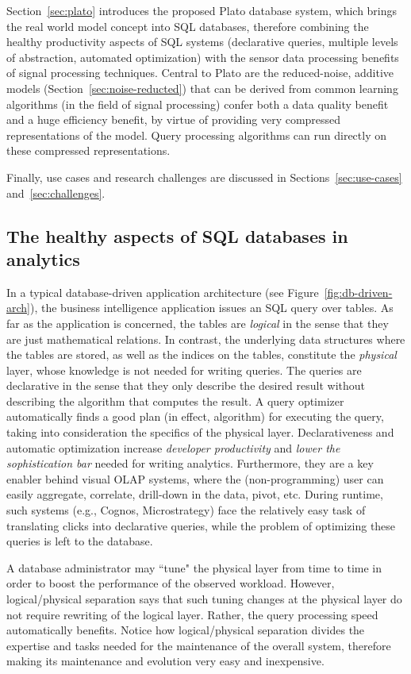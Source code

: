 Section~\ref{sec:plato} introduces the proposed Plato database system, which brings the real world model concept into SQL databases, therefore combining the healthy productivity aspects of SQL systems (declarative queries, multiple levels of abstraction, automated optimization) with the sensor data processing benefits of signal processing techniques. Central to Plato  are the reduced-noise, additive models (Section~\ref{sec:noise-reducted}) that can be derived from common learning algorithms (in the field of signal processing) confer both a data quality benefit and a huge efficiency benefit, by virtue of providing very compressed representations of the model. Query processing algorithms can run directly on these compressed representations.

Finally, use cases and research challenges are discussed in Sections~\ref{sec:use-cases} and~\ref{sec:challenges}.
 
\subsection{The healthy aspects of SQL databases in analytics}
\label{sec:healthy-aspects}

In a typical database-driven application architecture (see Figure~\ref{fig:db-driven-arch}), the business intelligence application issues an SQL query over tables. As far as the application is concerned, the tables are {\em logical} in the sense that they are just mathematical relations. In contrast, the underlying data structures where the tables are stored, as well as the indices on the tables, constitute the {\em physical} layer, whose knowledge is not needed for writing queries. The queries are declarative in the sense that they only describe the desired result without describing the algorithm that computes the result. A query optimizer automatically finds a good plan (in effect, algorithm) for executing the query, taking into consideration the specifics of the physical layer. Declarativeness and automatic optimization increase {\em developer productivity} and {\em lower the sophistication bar} needed for writing analytics. Furthermore, they are a key enabler behind visual OLAP systems, where the (non-programming) user can easily aggregate, correlate, drill-down in the data, pivot, etc. During runtime, such systems (e.g., Cognos, Microstrategy) face the relatively easy task of translating clicks into declarative queries, while the problem of optimizing these queries is left to the database.

A database administrator may ``tune" the physical layer from time to time in order to boost the performance of the observed workload. However, logical/physical separation says that such tuning changes at the physical layer do not require rewriting of the logical layer. Rather, the query processing speed automatically benefits. Notice how logical/physical separation divides the expertise and tasks needed for the maintenance of the overall system, therefore making its maintenance and evolution very easy and inexpensive.

